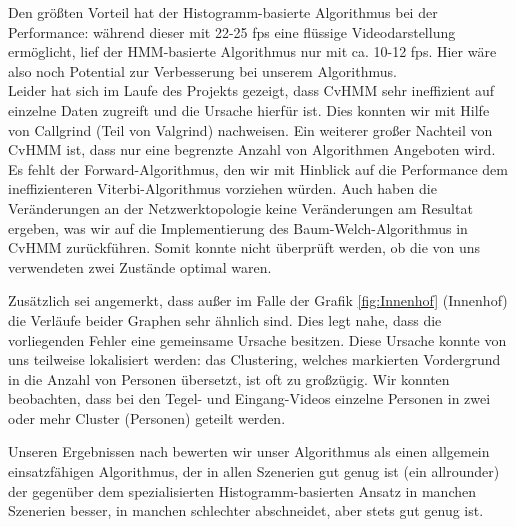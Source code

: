Den größten Vorteil hat der Histogramm-basierte Algorithmus bei der Performance: während dieser mit 22-25 fps eine flüssige Videodarstellung ermöglicht, lief der HMM-basierte Algorithmus nur mit ca. 10-12 fps. Hier wäre also noch Potential zur Verbesserung bei unserem Algorithmus.\\
Leider hat sich im Laufe des Projekts gezeigt, dass CvHMM sehr ineffizient auf einzelne Daten zugreift und die Ursache hierfür ist. Dies konnten wir mit Hilfe von Callgrind (Teil von Valgrind) nachweisen. Ein weiterer großer Nachteil von CvHMM ist, dass nur eine begrenzte Anzahl von Algorithmen Angeboten wird. Es fehlt der Forward-Algorithmus, den wir mit Hinblick auf die Performance dem ineffizienteren Viterbi-Algorithmus vorziehen würden. Auch haben die Veränderungen an der Netzwerktopologie keine Veränderungen am Resultat ergeben, was wir auf die Implementierung des Baum-Welch-Algorithmus in CvHMM zurückführen. Somit konnte nicht überprüft werden, ob die von uns verwendeten zwei Zustände optimal waren.

Zusätzlich sei angemerkt, dass außer im Falle der Grafik \ref{fig:Innenhof} (Innenhof) die Verläufe beider Graphen sehr ähnlich sind. Dies legt nahe, dass die vorliegenden Fehler eine gemeinsame Ursache besitzen. Diese Ursache konnte von uns teilweise lokalisiert werden: das Clustering, welches markierten Vordergrund in die Anzahl von Personen übersetzt, ist oft zu großzügig. Wir konnten beobachten, dass bei den Tegel- und Eingang-Videos einzelne Personen in zwei oder mehr Cluster (Personen) geteilt werden.

Unseren Ergebnissen nach bewerten wir unser Algorithmus als einen allgemein einsatzfähigen Algorithmus, der in allen Szenerien gut genug ist (ein \glqq allrounder\grqq{}) der gegenüber dem spezialisierten Histogramm-basierten Ansatz in manchen Szenerien besser, in manchen schlechter abschneidet, aber stets gut genug ist.
